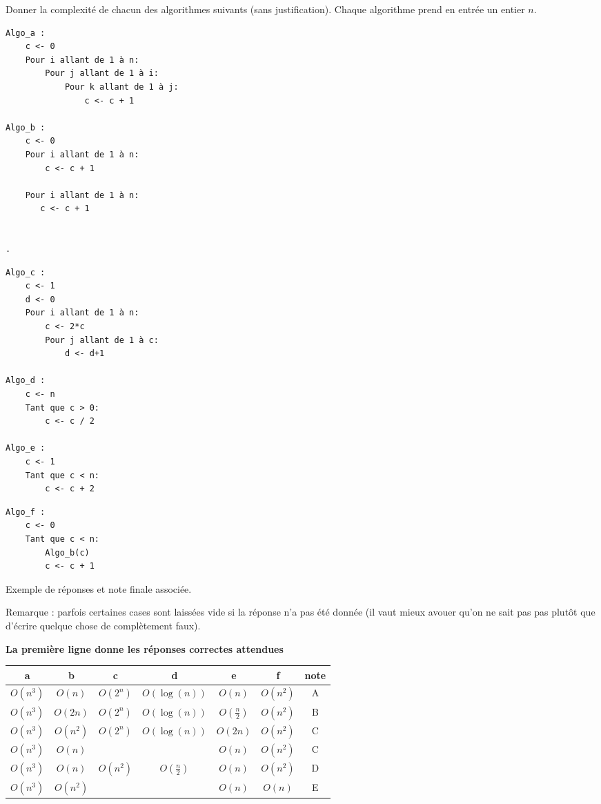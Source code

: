 
\begin{exercice}

Donner la complexité de chacun des algorithmes suivants (sans justification). Chaque algorithme 
prend en entrée un entier $n$. 

\begin{minipage}[t]{0.48 \textwidth}
\begin{lstlisting}
Algo_a :
    c <- 0
    Pour i allant de 1 à n:
        Pour j allant de 1 à i:
            Pour k allant de 1 à j:
                c <- c + 1
            
Algo_b :
    c <- 0
    Pour i allant de 1 à n:
        c <- c + 1
        
    Pour i allant de 1 à n:
       c <- c + 1
       
       
.            
\end{lstlisting}
\end{minipage}
\begin{minipage}[t]{0.48 \textwidth}
\begin{lstlisting}
Algo_c :
    c <- 1
    d <- 0
    Pour i allant de 1 à n:
        c <- 2*c
        Pour j allant de 1 à c:
            d <- d+1

Algo_d :
    c <- n
    Tant que c > 0:
        c <- c / 2 

Algo_e :
    c <- 1
    Tant que c < n:
        c <- c + 2
\end{lstlisting}
\end{minipage}

\begin{lstlisting}
Algo_f :
    c <- 0
    Tant que c < n:
        Algo_b(c)
        c <- c + 1
\end{lstlisting}

Exemple de réponses et note finale associée. 

Remarque : parfois certaines cases sont laissées vide si la réponse n'a pas été donnée (il vaut mieux avouer
qu'on ne sait pas pas plutôt que d'écrire quelque chose de complètement faux).

\textbf{La première ligne donne les réponses correctes attendues}

\begin{tabular}{|c|c|c|c|c|c|c|}
\hline 
a & b & c & d & e & f & note \\ \hline
$O(n^3)$ & $O(n)$ & $O(2^n)$ & $O(\log(n))$ & $O(n)$ & $O(n^2)$ & A \\ \hline \hline
$O(n^3)$ & $O(2n)$ & $O(2^n)$ & $O(\log(n))$ & $O(\frac{n}{2})$ & $O(n^2)$ & B \\ \hline
$O(n^3)$ & $O(n^2)$ & $O(2^n)$ & $O(\log(n))$ & $O(2n)$ & $O(n^2)$ & C \\ \hline
$O(n^3)$ & $O(n)$ &  &  & $O(n)$ & $O(n^2)$ & C \\ \hline 
$O(n^3)$ & $O(n)$ & $O(n^2)$ & $O(\frac{n}{2})$ & $O(n)$ & $O(n^2)$ & D \\ \hline
$O(n^3)$ & $O(n^2)$ &  &  & $O(n)$ & $O(n)$ & E \\ \hline
\end{tabular}

\end{exercice}